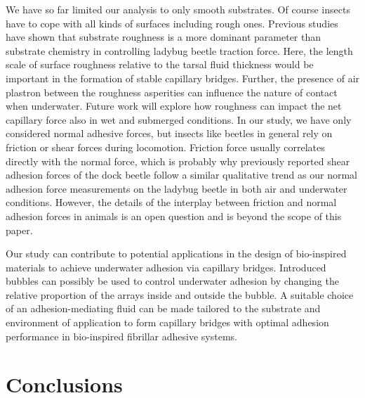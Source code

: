 \documentclass[vruler,JEB]{COB}%
\begin{document}
We have so far limited our analysis to only smooth substrates. Of course insects
have to cope with all kinds of surfaces including rough ones.
Previous studies \citep{RN136} have shown that substrate roughness
is a more dominant parameter than substrate chemistry in controlling
ladybug beetle traction force. Here, the length scale of surface roughness relative to the tarsal fluid thickness would be important in the formation of stable capillary bridges. Further, the presence of air plastron between the roughness asperities can influence the nature of contact when underwater. Future work will explore how roughness can impact
the net capillary force also in wet and submerged conditions. In our study, we have only considered normal adhesive forces, but insects like beetles in general rely on friction or shear forces during locomotion. Friction force usually correlates directly with the normal force, which is probably why previously reported shear adhesion forces of the dock beetle \citep{RN87} follow a similar qualitative trend as our normal adhesion force measurements on the ladybug beetle in both air and underwater conditions. However, the details of the interplay between friction and normal adhesion forces in animals is an open question and is beyond the scope of this paper. 

Our study can contribute to potential applications in the design of bio-inspired materials to achieve underwater adhesion
via capillary bridges. Introduced bubbles can possibly be used to control underwater
adhesion by changing the relative proportion of the arrays inside
and outside the bubble. A suitable choice of an adhesion-mediating fluid can be
made tailored to the substrate and environment of application to form capillary bridges with 
optimal adhesion performance in bio-inspired fibrillar adhesive systems.

\section{Conclusions}
\end{document}
